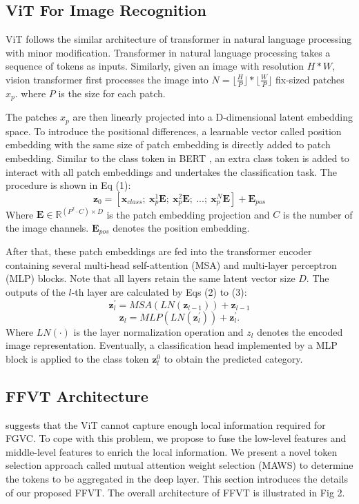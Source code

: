 \documentclass{bmvc2k}
\begin{document}
\subsection{ViT For Image Recognition}
ViT follows the similar architecture of transformer in natural language processing with minor modification. Transformer in natural language processing takes a sequence of tokens as inputs. Similarly, given an image with resolution $ H*W$,  vision transformer first processes the image into $N=\lfloor \frac{H}{P} \rfloor * \lfloor \frac{W}{P} \rfloor$ fix-sized patches $x_p$. where $P$ is the size for each patch. 
\par
The patches $x_p$ are then linearly projected into a D-dimensional latent embedding space. To introduce the positional differences, a learnable vector called position embedding with the same size of patch embedding is directly added to patch embedding. Similar to the class token in BERT \cite{devlin2018bert}, an extra class token is added to interact with all patch embeddings and undertakes the classification task. The procedure is shown in Eq (1):
\begin{equation}
 \bm{z}_0=[\bm{x}_{class};\ \bm{x}^1_p\bm{E};\ \bm{x}^2_p\bm{E};\ ...;\ \bm{x}^N_p\bm{E}]+\bm{E}_{pos}
\end{equation}
\noindent
Where $\bm{E}\in \mathbb{R}^{(P^2\cdot C) \times D}$ is the patch embedding projection and $C$ is the number of the image channels. $\bm{E}_{pos}$ denotes the position embedding.
\par
After that, these patch embeddings are fed into the transformer encoder containing several multi-head self-attention (MSA) and multi-layer perceptron (MLP) blocks. Note that all layers retain the same latent vector size $D$. The outputs of the $l$-th layer are calculated by Eqs (2) to (3):
\begin{equation}
 \bm{z}^{'}_{l}=MSA(LN(\bm{z}_{l-1}))+\bm{z}_{l-1}
\end{equation}
\begin{equation}
 \bm{z}_{l}=MLP(LN(\bm{z}^{'}_{l}))+\bm{z}^{'}_{l}.
\end{equation}
\noindent
Where $LN(\cdot)$ is the layer normalization operation and $z_l$ denotes the encoded image representation. Eventually, a classification head implemented by a MLP block is applied to the class token $\bm{z}_l^0$ to obtain the predicted category.
\par

\subsection{FFVT Architecture}
\cite{he2021transfg} suggests that the ViT cannot capture enough local information required for FGVC. To cope with this problem, we propose to fuse the low-level features and middle-level features to enrich the local information. We present a novel token selection approach called mutual attention weight selection (MAWS) to determine the tokens to be aggregated in the deep layer. This section introduces the details of our proposed FFVT. The overall architecture of FFVT is illustrated in Fig 2.
\end{document}
